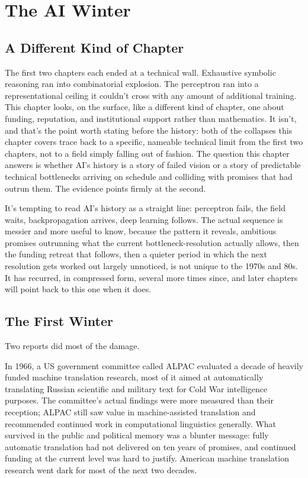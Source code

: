 \chapter{The AI Winter}

\section*{A Different Kind of Chapter}

The first two chapters each ended at a technical wall. Exhaustive symbolic reasoning ran into combinatorial explosion. The perceptron ran into a representational ceiling it couldn't cross with any amount of additional training. This chapter looks, on the surface, like a different kind of chapter, one about funding, reputation, and institutional support rather than mathematics. It isn't, and that's the point worth stating before the history: both of the collapses this chapter covers trace back to a specific, nameable technical limit from the first two chapters, not to a field simply falling out of fashion. The question this chapter answers is whether AI's history is a story of failed vision or a story of predictable technical bottlenecks arriving on schedule and colliding with promises that had outrun them. The evidence points firmly at the second.

It's tempting to read AI's history as a straight line: perceptron fails, the field waits, backpropagation arrives, deep learning follows. The actual sequence is messier and more useful to know, because the pattern it reveals, ambitious promises outrunning what the current bottleneck-resolution actually allows, then the funding retreat that follows, then a quieter period in which the next resolution gets worked out largely unnoticed, is not unique to the 1970s and 80s. It has recurred, in compressed form, several more times since, and later chapters will point back to this one when it does.

\section*{The First Winter}

Two reports did most of the damage.

In 1966, a US government committee called ALPAC evaluated a decade of heavily funded machine translation research, most of it aimed at automatically translating Russian scientific and military text for Cold War intelligence purposes. The committee's actual findings were more measured than their reception; ALPAC still saw value in machine-assisted translation and recommended continued work in computational linguistics generally. What survived in the public and political memory was a blunter message: fully automatic translation had not delivered on ten years of promises, and continued funding at the current level was hard to justify. American machine translation research went dark for most of the next two decades.


